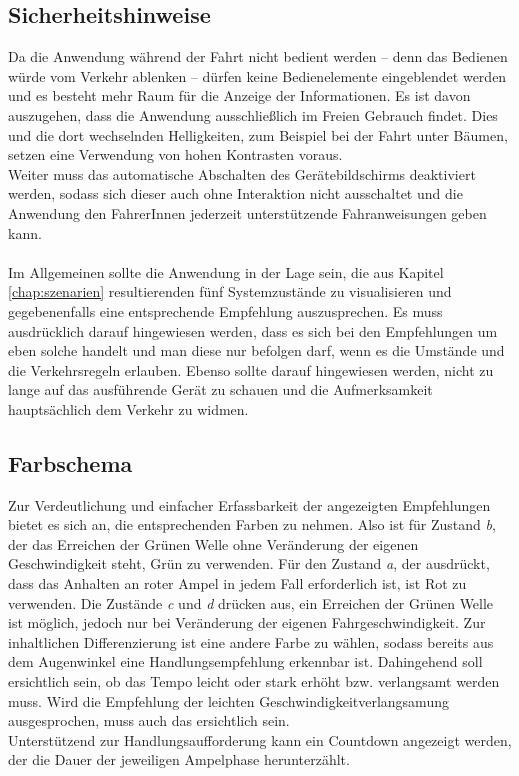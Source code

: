 \subsection{Sicherheitshinweise}
Da die Anwendung während der Fahrt nicht bedient werden -- denn das Bedienen würde vom Verkehr ablenken -- dürfen keine Bedienelemente eingeblendet werden und es besteht mehr Raum für die Anzeige der Informationen. 
Es ist davon auszugehen, dass die Anwendung ausschließlich im Freien Gebrauch findet. Dies und die dort wechselnden Helligkeiten, zum Beispiel bei der Fahrt unter Bäumen, setzen eine Verwendung von hohen Kontrasten voraus.\\ 
Weiter muss das automatische Abschalten des Gerätebildschirms deaktiviert werden, sodass sich dieser auch ohne Interaktion nicht ausschaltet und die Anwendung den FahrerInnen jederzeit unterstützende Fahranweisungen geben kann. \\\\
Im Allgemeinen sollte die Anwendung in der Lage sein, die aus Kapitel \ref{chap:szenarien} resultierenden fünf Systemzustände zu visualisieren und gegebenenfalls eine entsprechende Empfehlung auszusprechen. Es muss ausdrücklich darauf hingewiesen werden, dass es sich bei den Empfehlungen um eben solche handelt und man diese nur befolgen darf, wenn es die Umstände und die Verkehrsregeln erlauben. Ebenso sollte darauf hingewiesen werden, nicht zu lange auf das ausführende Gerät zu schauen und die Aufmerksamkeit hauptsächlich dem Verkehr zu widmen.
\subsection{Farbschema}
Zur Verdeutlichung und einfacher Erfassbarkeit der angezeigten Empfehlungen bietet es sich an, die entsprechenden Farben zu nehmen. Also ist für Zustand \textit{b}, der das Erreichen der Grünen Welle ohne Veränderung der eigenen Geschwindigkeit steht, Grün zu verwenden. Für den Zustand \textit{a}, der ausdrückt, dass das Anhalten an roter Ampel in jedem Fall erforderlich ist, ist Rot zu verwenden.
Die Zustände \textit{c} und \textit{d} drücken aus, ein Erreichen der Grünen Welle ist möglich, jedoch nur bei Veränderung der eigenen Fahrgeschwindigkeit. Zur inhaltlichen Differenzierung ist eine andere Farbe zu wählen, sodass bereits aus dem Augenwinkel eine Handlungsempfehlung erkennbar ist. Dahingehend soll ersichtlich sein, ob das Tempo leicht oder stark erhöht bzw. verlangsamt werden muss. Wird die Empfehlung der leichten Geschwindigkeitverlangsamung ausgesprochen, muss auch das ersichtlich sein.\\
Unterstützend zur Handlungsaufforderung kann ein Countdown angezeigt werden, der die Dauer der jeweiligen Ampelphase herunterzählt. 
